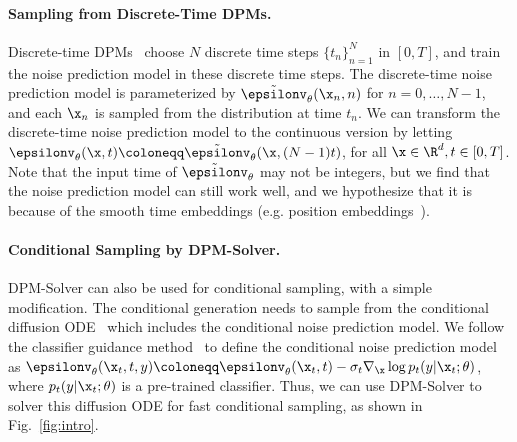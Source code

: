 \paragraph{Sampling from Discrete-Time DPMs.}
Discrete-time DPMs~\citep{ho2020denoising} choose $N$ discrete time steps $\{t_n\}_{n=1}^N$ in $[0,T]$, and train the noise prediction model in these discrete time steps. The discrete-time noise prediction model is parameterized by $\tilde\epsilonv_\theta(\x_n, n)$ for $n=0,\dots,N-1$, and each $\x_n$ is sampled from the distribution at time $t_n$. We can transform the discrete-time noise prediction model to the continuous version by letting
$\epsilonv_\theta(\x, t)\coloneqq \tilde\epsilonv_\theta(\x, (N - 1)t)$, for all $\x\in\R^d, t\in[0,T]$.
Note that the input time of $\tilde\epsilonv_\theta$ may not be integers, but we find that the noise prediction model can still work well, and we hypothesize that it is because of the smooth time embeddings (e.g. position embeddings~\citep{ho2020denoising}).

\paragraph{Conditional Sampling by DPM-Solver.}
DPM-Solver can also be used for conditional sampling, with a simple modification. The conditional generation needs to sample from the conditional diffusion ODE~\citep{song2020score, dhariwal2021diffusion} which includes the conditional noise prediction model. We follow the classifier guidance method~\citep{dhariwal2021diffusion} to define the conditional noise prediction model as $\epsilonv_\theta(\x_t,t,y)\coloneqq \epsilonv_\theta(\x_t,t) - \sigma_t\nabla_{\x}\log p_t(y|\x_t;\theta)$, where $p_t(y|\x_t;\theta)$ is a pre-trained classifier. Thus, we can use DPM-Solver to solver this diffusion ODE for fast conditional sampling, as shown in Fig.~\ref{fig:intro}.
